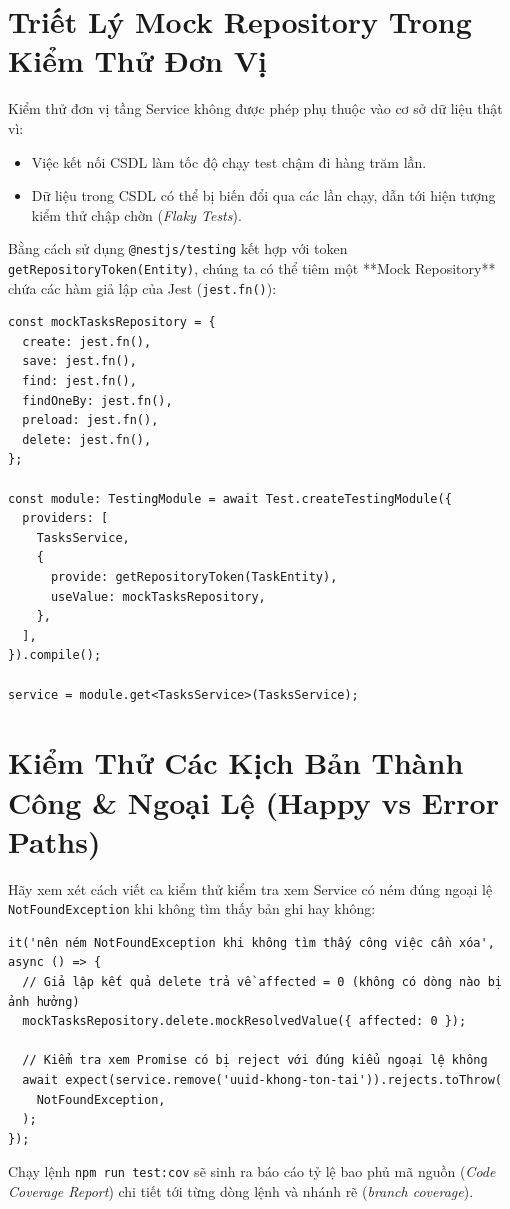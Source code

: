 \documentclass[12pt,a4paper,oneside]{book}
\begin{document}
\section{Triết Lý Mock Repository Trong Kiểm Thử Đơn Vị}
Kiểm thử đơn vị tầng Service không được phép phụ thuộc vào cơ sở dữ liệu thật vì:
\begin{itemize}
  \item Việc kết nối CSDL làm tốc độ chạy test chậm đi hàng trăm lần.
  \item Dữ liệu trong CSDL có thể bị biến đổi qua các lần chạy, dẫn tới hiện tượng kiểm thử chập chờn (\textit{Flaky Tests}).
\end{itemize}

Bằng cách sử dụng \texttt{@nestjs/testing} kết hợp với token \texttt{getRepositoryToken(Entity)}, chúng ta có thể tiêm một **Mock Repository** chứa các hàm giả lập của Jest (\texttt{jest.fn()}):

\begin{codebox}
\begin{Verbatim}[fontsize=\small]
const mockTasksRepository = {
  create: jest.fn(),
  save: jest.fn(),
  find: jest.fn(),
  findOneBy: jest.fn(),
  preload: jest.fn(),
  delete: jest.fn(),
};

const module: TestingModule = await Test.createTestingModule({
  providers: [
    TasksService,
    {
      provide: getRepositoryToken(TaskEntity),
      useValue: mockTasksRepository,
    },
  ],
}).compile();

service = module.get<TasksService>(TasksService);
\end{Verbatim}
\end{codebox}

\section{Kiểm Thử Các Kịch Bản Thành Công \& Ngoại Lệ (Happy vs Error Paths)}
Hãy xem xét cách viết ca kiểm thử kiểm tra xem Service có ném đúng ngoại lệ \texttt{NotFoundException} khi không tìm thấy bản ghi hay không:

\begin{codebox}
\begin{Verbatim}[fontsize=\small]
it('nên ném NotFoundException khi không tìm thấy công việc cần xóa', async () => {
  // Giả lập kết quả delete trả về affected = 0 (không có dòng nào bị ảnh hưởng)
  mockTasksRepository.delete.mockResolvedValue({ affected: 0 });

  // Kiểm tra xem Promise có bị reject với đúng kiểu ngoại lệ không
  await expect(service.remove('uuid-khong-ton-tai')).rejects.toThrow(
    NotFoundException,
  );
});
\end{Verbatim}
\end{codebox}
Chạy lệnh \texttt{npm run test:cov} sẽ sinh ra báo cáo tỷ lệ bao phủ mã nguồn (\textit{Code Coverage Report}) chi tiết tới từng dòng lệnh và nhánh rẽ (\textit{branch coverage}).
\end{document}
